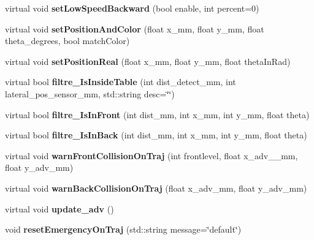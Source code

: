 \begin{DoxyCompactItemize}
virtual void {\bfseries set\+Low\+Speed\+Backward} (bool enable, int percent=0)
\item 
\mbox{\label{classAsserv_a050645863c2a40f3116ee0847d1d3732}} 
virtual void {\bfseries set\+Position\+And\+Color} (float x\+\_\+mm, float y\+\_\+mm, float theta\+\_\+degrees, bool match\+Color)
\item 
\mbox{\label{classAsserv_abe526ad31d80f46598cdbb031a83a906}} 
virtual void {\bfseries set\+Position\+Real} (float x\+\_\+mm, float y\+\_\+mm, float theta\+In\+Rad)
\item 
\mbox{\label{classAsserv_acc337a9f3d054ba09e3043a560a457a7}} 
virtual bool {\bfseries filtre\+\_\+\+Is\+Inside\+Table} (int dist\+\_\+detect\+\_\+mm, int lateral\+\_\+pos\+\_\+sensor\+\_\+mm, std\+::string desc=\char`\"{}\char`\"{})
\item 
\mbox{\label{classAsserv_a74838cb9894b41a16db23aac3de880b8}} 
virtual bool {\bfseries filtre\+\_\+\+Is\+In\+Front} (int dist\+\_\+mm, int x\+\_\+mm, int y\+\_\+mm, float theta)
\item 
\mbox{\label{classAsserv_aa6eb54a46377d1043d8b8c16c5330185}} 
virtual bool {\bfseries filtre\+\_\+\+Is\+In\+Back} (int dist\+\_\+mm, int x\+\_\+mm, int y\+\_\+mm, float theta)
\item 
\mbox{\label{classAsserv_a483f99d2f4545707cab4399b7bfb158b}} 
virtual void {\bfseries warn\+Front\+Collision\+On\+Traj} (int frontlevel, float x\+\_\+adv\+\_\+\+\_\+mm, float y\+\_\+adv\+\_\+mm)
\item 
\mbox{\label{classAsserv_a6bf02a8d93a6104906f004997e1a3644}} 
virtual void {\bfseries warn\+Back\+Collision\+On\+Traj} (float x\+\_\+adv\+\_\+mm, float y\+\_\+adv\+\_\+mm)
\item 
\mbox{\label{classAsserv_a9a073136f6af1298bb0dcef2db1f0c01}} 
virtual void {\bfseries update\+\_\+adv} ()
\item 
\mbox{\label{classAsserv_a22cbdc18185f0d910473b8a5bb434c84}} 
void {\bfseries reset\+Emergency\+On\+Traj} (std\+::string message=\char`\"{}default\char`\"{})

\end{DoxyCompactItemize}
